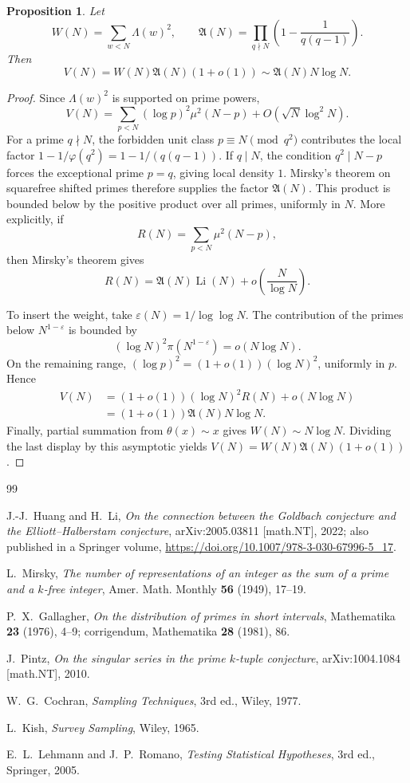 \documentclass[11pt,a4paper]{article}
\theoremstyle{plain}
\newtheorem{proposition}[theorem]{Proposition}
\theoremstyle{definition}
\theoremstyle{remark}
\newcommand{\AAA}{\mathfrak{A}}
\begin{document}
\begin{proposition}\label{prop:V}
Let
\[
 W(N)=\sum_{w<N}\Lambda(w)^2,\qquad
 \AAA(N)=\prod_{q\nmid N}\left(1-\frac1{q(q-1)}\right).
\]
Then
\[
 V(N)=W(N)\AAA(N)(1+o(1))
 \sim \AAA(N)N\log N.
\]
\end{proposition}

\begin{proof}
Since $\Lambda(w)^2$ is supported on prime powers,
\[
 V(N)=\sum_{p<N}(\log p)^2\mu^2(N-p)
      +O(\sqrt N\log^2N).
\]
For a prime $q\nmid N$, the forbidden unit class
$p\equiv N\pmod{q^2}$ contributes the local factor
$1-1/\varphi(q^2)=1-1/(q(q-1))$.  If $q\mid N$, the condition
$q^2\mid N-p$ forces the exceptional prime $p=q$, giving local density
$1$.  Mirsky's theorem on squarefree shifted primes \cite{Mir49}
therefore supplies the factor $\AAA(N)$.  This product is bounded below
by the positive product over all primes, uniformly in $N$.
More explicitly, if
\[
 R(N)=\sum_{p<N}\mu^2(N-p),
\]
then Mirsky's theorem gives
\[
 R(N)=\AAA(N)\operatorname{Li}(N)+o\!\left(\frac N{\log N}\right).
\]

To insert the weight, take
$\varepsilon(N)=1/\log\log N$.  The contribution of the primes below
$N^{1-\varepsilon}$ is bounded by
\[
 (\log N)^2\pi(N^{1-\varepsilon})=o(N\log N).
\]
On the remaining range,
$(\log p)^2=(1+o(1))(\log N)^2$, uniformly in $p$.  Hence
\[
\begin{aligned}
 V(N)
 &=(1+o(1))(\log N)^2R(N)+o(N\log N)\\
 &=(1+o(1))\AAA(N)N\log N.
\end{aligned}
\]
Finally, partial summation from $\theta(x)\sim x$ gives
$W(N)\sim N\log N$.  Dividing the last display by this asymptotic
yields $V(N)=W(N)\AAA(N)(1+o(1))$.
\end{proof}

\begin{thebibliography}{99}

J.-J.~Huang and H.~Li,
\emph{On the connection between the Goldbach conjecture and the
Elliott--Halberstam conjecture}, arXiv:2005.03811 [math.NT], 2022;
also published in a Springer volume,
\url{https://doi.org/10.1007/978-3-030-67996-5_17}.

L.~Mirsky,
\emph{The number of representations of an integer as the sum of a
prime and a $k$-free integer},
Amer. Math. Monthly \textbf{56} (1949), 17--19.

P.~X.~Gallagher,
\emph{On the distribution of primes in short intervals},
Mathematika \textbf{23} (1976), 4--9; corrigendum,
Mathematika \textbf{28} (1981), 86.

J.~Pintz,
\emph{On the singular series in the prime $k$-tuple conjecture},
arXiv:1004.1084 [math.NT], 2010.

W.~G.~Cochran,
\emph{Sampling Techniques}, 3rd ed., Wiley, 1977.

L.~Kish,
\emph{Survey Sampling}, Wiley, 1965.

E.~L.~Lehmann and J.~P.~Romano,
\emph{Testing Statistical Hypotheses}, 3rd ed., Springer, 2005.

\end{thebibliography}
\end{document}
